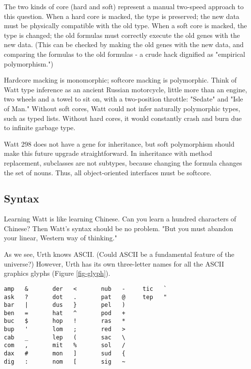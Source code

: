 \documentclass[10pt, nocopyrightspace]{sigplanconf}
\begin{document}
The two kinds of core (hard and soft) represent a manual
two-speed approach to this question.  When a hard core is macked,
the type is preserved; the new data must be physically compatible
with the old type.  When a soft core is macked, the type is
changed; the old formulas must correctly execute the old genes
with the new data.  (This can be checked by making the old genes
with the new data, and comparing the formulas to the old formulas -
a crude hack dignified as "empirical polymorphism.")

Hardcore macking is monomorphic; softcore macking is polymorphic.
Think of Watt type inference as an ancient Russian motorcycle,
little more than an engine, two wheels and a towel to sit on,
with a two-position throttle: "Sedate" and "Isle of Man."
Without soft cores, Watt could not infer naturally polymorphic
types, such as typed lists.  Without hard cores, it would
constantly crash and burn due to infinite garbage type.

Watt 298 does not have a gene for inheritance, but soft
polymorphism should make this future upgrade straightforward.  In
inheritance with method replacement, subclasses are not subtypes,
because changing the formula changes the set of nouns.  Thus, all
object-oriented interfaces must be softcore.

\subsection{Syntax}

Learning Watt is like learning Chinese.  Can you learn a hundred
characters of Chinese?  Then Watt's syntax should be no problem.
"But you must abandon your linear, Western way of thinking."

As we see, Urth knows ASCII.  (Could ASCII be a fundamental
feature of the universe?)  However, Urth has its own three-letter
names for all the ASCII graphics glyphs (Figure \ref{fig-glyph}).

\begin{figure*}
\begin{center}
\makebox[\textwidth]{\hrulefill}
\begin{verbatim}
amp   &       der   <       nub   -     tic   `
ask   ?       dot   .       pat   @     tep   "
bar   |       dus   }       pel   )
ben   =       hat   ^       pod   +
buc   $       hop   !       ras   *
bup   '       lom   ;       red   >
cab   _       lep   (       sac   \
com   ,       mit   %       sol   /
dax   #       mon   ]       sud   {
dig   :       nom   [       sig   ~
\end{verbatim}
\end{center}
\caption{Urth glyphs}
\label{fig-glyph}
\end{figure*}
\end{document}
